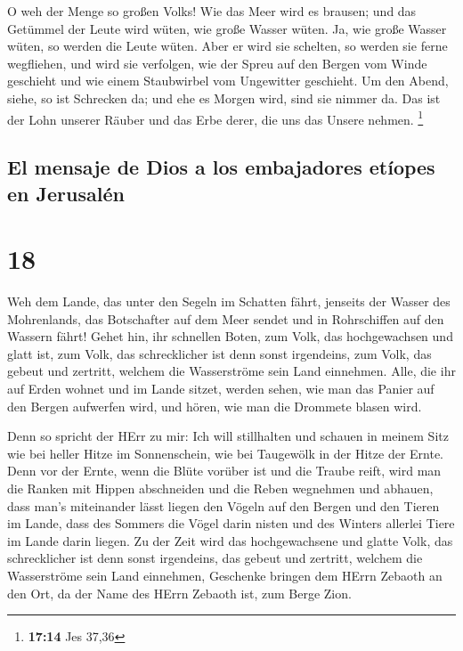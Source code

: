  O weh der Menge so großen Volks! Wie das Meer wird es
brausen; und das Getümmel der Leute wird wüten, wie große Wasser wüten.
 Ja, wie große Wasser wüten, so werden die Leute wüten.
Aber er wird sie schelten, so werden sie ferne wegfliehen, und wird sie
verfolgen, wie der Spreu auf den Bergen vom Winde geschieht und wie
einem Staubwirbel vom Ungewitter geschieht.  Um den
Abend, siehe, so ist Schrecken da; und ehe es Morgen wird, sind sie
nimmer da. Das ist der Lohn unserer Räuber und das Erbe derer, die uns
das Unsere nehmen. \footnote{\textbf{17:14} Jes 37,36}

\hypertarget{el-mensaje-de-dios-a-los-embajadores-etuxedopes-en-jerusaluxe9n}{%
\subsection{El mensaje de Dios a los embajadores etíopes en
Jerusalén}\label{el-mensaje-de-dios-a-los-embajadores-etuxedopes-en-jerusaluxe9n}}

\hypertarget{section-17}{%
\section{18}\label{section-17}}

 Weh dem Lande, das unter den Segeln im Schatten fährt,
jenseits der Wasser des Mohrenlands,  das Botschafter auf
dem Meer sendet und in Rohrschiffen auf den Wassern fährt! Gehet hin,
ihr schnellen Boten, zum Volk, das hochgewachsen und glatt ist, zum
Volk, das schrecklicher ist denn sonst irgendeins, zum Volk, das gebeut
und zertritt, welchem die Wasserströme sein Land einnehmen.
 Alle, die ihr auf Erden wohnet und im Lande sitzet,
werden sehen, wie man das Panier auf den Bergen aufwerfen wird, und
hören, wie man die Drommete blasen wird.

 Denn so spricht der HErr zu mir: Ich will stillhalten und
schauen in meinem Sitz wie bei heller Hitze im Sonnenschein, wie bei
Taugewölk in der Hitze der Ernte.  Denn vor der Ernte,
wenn die Blüte vorüber ist und die Traube reift, wird man die Ranken mit
Hippen abschneiden und die Reben wegnehmen und abhauen, 
dass man's miteinander lässt liegen den Vögeln auf den Bergen und den
Tieren im Lande, dass des Sommers die Vögel darin nisten und des Winters
allerlei Tiere im Lande darin liegen.  Zu der Zeit wird
das hochgewachsene und glatte Volk, das schrecklicher ist denn sonst
irgendeins, das gebeut und zertritt, welchem die Wasserströme sein Land
einnehmen, Geschenke bringen dem HErrn Zebaoth an den Ort, da der Name
des HErrn Zebaoth ist, zum Berge Zion.

